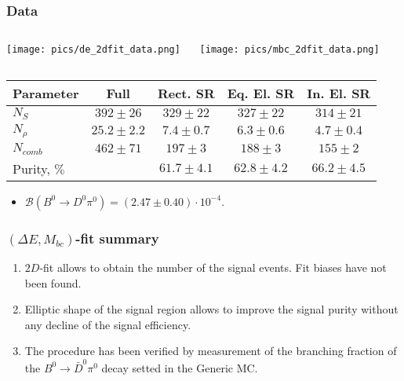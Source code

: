 \documentclass[10 pt,compress,mathserif]{beamer}
\newcommand{\bdpi}{\ensuremath{B^0\to \bar D^0\pi^0}\xspace}
\begin{document}
\begin{frame}
\frametitle{Data}
 \begin{columns}
  \begin{column}{0.33\textwidth}
   \begin{center}
    \texttt{[image: pics/de\_2dfit\_data.png]}
   \end{center}
  \end{column}
  \begin{column}{0.33\textwidth}
   \begin{center}
    \texttt{[image: pics/mbc\_2dfit\_data.png]}
   \end{center}
  \end{column}
  \begin{column}{0.34\textwidth}
   \begin{center}
   \end{center}
  \end{column}
 \end{columns}
 
\begin{table}[bt]
 \small
 \begin{tabular}{|l|c|c|c|c|} \hline
  Parameter  &      Full    & Rect. SR     &  Eq. El. SR & In. El. SR  \\ \hline
  $N_S$      & $392 \pm 26$ & $329\pm22$   & $327\pm22$  & $314\pm21$  \\ \hline
  $N_{\rho}$ & $25.2\pm 2.2$& $7.4\pm0.7$  & $6.3\pm0.6$ & $4.7\pm0.4$ \\ \hline
  $N_{comb}$ & $462 \pm 71$ & $197\pm3$    & $188\pm3$   & $155\pm2$   \\ \hline
Purity, $\%$ &              & $61.7\pm4.1$ & $62.8\pm4.2$& $66.2\pm4.5$\\ \hline
 \end{tabular}
 \end{table}

 \begin{itemize}
  \item $\mathcal{B}(B^0\to D^0\pi^0) = (2.47\pm0.40)\cdot 10^{-4}$.
 \end{itemize}
\end{frame}

\begin{frame}
 \frametitle{$(\Delta E,M_{bc})$-fit summary}
 \begin{enumerate}
  \item $2D$-fit allows to obtain the number of the signal events. Fit biases have not been found.
  \item Elliptic shape of the signal region allows to improve the signal purity without any decline of the signal efficiency.
  \item The procedure has been verified by measurement of the branching fraction of the \bdpi decay setted in the Generic MC.
 \end{enumerate}
\end{frame}
\end{document}
